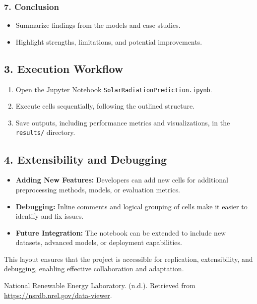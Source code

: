 \documentclass[10pt,twocolumn]{article}
\begin{document}
\begin{itemize}
\subsubsection*{7. Conclusion}
\begin{itemize}
    \item Summarize findings from the models and case studies.
    \item Highlight strengths, limitations, and potential improvements.
\end{itemize}

\subsection*{3. Execution Workflow}
\begin{enumerate}
    \item Open the Jupyter Notebook \texttt{SolarRadiationPrediction.ipynb}.
    \item Execute cells sequentially, following the outlined structure.
    \item Save outputs, including performance metrics and visualizations, in the \texttt{results/} directory.
\end{enumerate}

\subsection*{4. Extensibility and Debugging}
\begin{itemize}
    \item \textbf{Adding New Features:} Developers can add new cells for additional preprocessing methods, models, or evaluation metrics.
    \item \textbf{Debugging:} Inline comments and logical grouping of cells make it easier to identify and fix issues.
    \item \textbf{Future Integration:} The notebook can be extended to include new datasets, advanced models, or deployment capabilities.
\end{itemize}

This layout ensures that the project is accessible for replication, extensibility, and debugging, enabling effective collaboration and adaptation.








\newpage
\begin{thebibliography}{200}

 National Renewable Energy Laboratory. (n.d.). Retrieved from \url{https://nsrdb.nrel.gov/data-viewer}.


\end{thebibliography}
\end{itemize}
\end{document}
